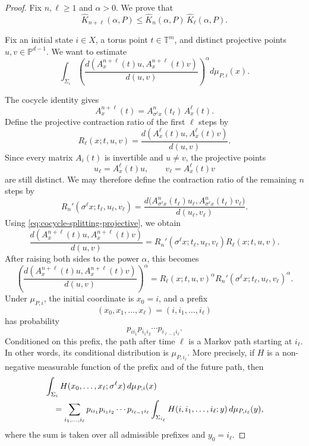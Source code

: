 \documentclass[11pt,a4paper]{amsart}
\newcommand{\T}{\mathbb T}
\newcommand{\PP}{\mathbb P}
\begin{document}
\begin{proof}
Fix \(n,\ell\geq1\) and \(\alpha>0\).  We prove that
\[
 \widehat K_{n+\ell}(\alpha,P)
 \leq
 \widehat K_n(\alpha,P)\,
 \widehat K_\ell(\alpha,P).
\]

Fix an initial state \(i\in X\), a torus point \(t\in\T^m\), and
distinct projective points \(u,v\in\PP^{d-1}\).  We want to  estimate
\[
 \int_{\Sigma_i}
 \left(
 \frac{
 d(A_x^{n+\ell}(t)u,A_x^{n+\ell}(t)v)}
 {d(u,v)}
 \right)^\alpha
 d\mu_{P,i}(x).
\]

The cocycle identity gives
\begin{equation}\label{eq:cocycle-splitting-projective}
 A_x^{n+\ell}(t)
 =
 A_{\sigma^\ell x}^{n}(t_\ell)\,
 A_x^\ell(t).
\end{equation}
Define the projective contraction ratio of the first \(\ell\) steps by
\[
 R_\ell(x;t,u,v)
 =
 \frac{
 d(A_x^\ell(t)u,A_x^\ell(t)v)}
 {d(u,v)}.
\]
Since every matrix \(A_i(t)\) is invertible and \(u\neq v\), the
projective points
\[
 u_\ell=A_x^\ell(t)u,
 \qquad
 v_\ell=A_x^\ell(t)v
\]
are still distinct.  We may therefore define the contraction ratio of
the remaining \(n\) steps by
\[
 R_n'(\sigma^\ell x;t_\ell,u_\ell,v_\ell)
 =
 \frac{
 d\bigl(
 A_{\sigma^\ell x}^{n}(t_\ell)u_\ell,
 A_{\sigma^\ell x}^{n}(t_\ell)v_\ell
 \bigr)}
 {d(u_\ell,v_\ell)}.
\]
Using \eqref{eq:cocycle-splitting-projective}, we obtain %
$$
 \frac{
 d(A_x^{n+\ell}(t)u,A_x^{n+\ell}(t)v)}
 {d(u,v)} =  R_n'(\sigma^\ell x;t_\ell,u_\ell,v_\ell) R_\ell(x;t,u,v).
$$
After raising both sides to the power \(\alpha\), this becomes
\begin{equation}\label{eq:factor-projective-ratio}
 \left(
 \frac{
 d(A_x^{n+\ell}(t)u,A_x^{n+\ell}(t)v)}
 {d(u,v)}
 \right)^\alpha
 =
 R_\ell(x;t,u,v)^\alpha
 R_n'(\sigma^\ell x;t_\ell,u_\ell,v_\ell)^\alpha.
\end{equation}
Under
\(\mu_{P,i}\), the initial coordinate is \(x_0=i\), and a prefix
\[
 (x_0,x_1,\ldots,x_\ell)
 =
 (i,i_1,\ldots,i_\ell)
\]
has probability
\[
 p_{ii_1}p_{i_1i_2}\cdots p_{i_{\ell-1}i_\ell}.
\]
Conditioned on this prefix, the path after time \(\ell\) is a Markov
path starting at \(i_\ell\).  In other words, its conditional
distribution is \(\mu_{P,i_\ell}\). More precisely, if \(H\) is a non-negative measurable function of the
prefix and of the future path, then
\begin{align}
 &\int_{\Sigma_i}
 H(x_0,\ldots,x_\ell;\sigma^\ell x)
 \,d\mu_{P,i}(x)
 \notag\\
 &\quad=
 \sum_{i_1,\ldots,i_\ell}
 p_{ii_1}p_{i_1i_2}\cdots p_{i_{\ell-1}i_\ell}
 \int_{\Sigma_{i_\ell}}
 H(i,i_1,\ldots,i_\ell;y)
 \,d\mu_{P,i_\ell}(y),
 \label{eq:explicit-markov-disintegration}
\end{align}
where the sum is taken over all admissible prefixes and \(y_0=i_\ell\).


\end{proof}
\end{document}
